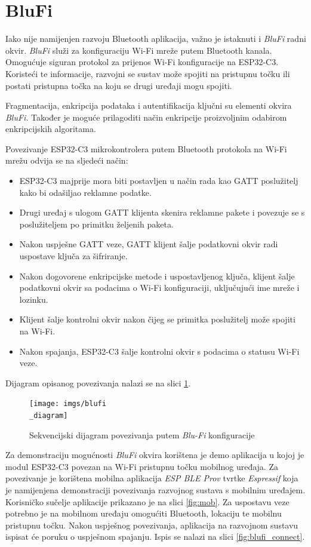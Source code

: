 \section{BluFi}

Iako nije namijenjen razvoju Bluetooth aplikacija, važno je istaknuti i \textit{BluFi} radni okvir. \textit{BluFi} služi za konfiguraciju Wi-Fi mreže putem Bluetooth kanala. Omogućuje siguran protokol za prijenos Wi-Fi konfiguracije na ESP32-C3. Koristeći te informacije, razvojni se sustav može spojiti na pristupnu točku ili postati pristupna točka na koju se drugi uređaji mogu spojiti.

Fragmentacija, enkripcija podataka i autentifikacija ključni su elementi okvira \textit{BluFi}. Također je moguće prilagoditi način enkripcije proizvoljnim odabirom enkripcijskih algoritama.

Povezivanje ESP32-C3 mikrokontrolera putem Bluetooth protokola na Wi-Fi mrežu odvija se na sljedeći način:
\begin{itemize}
	\item ESP32-C3 majprije mora biti postavljen u način rada kao GATT poslužitelj kako bi odašiljao reklamne podatke. 
	\item Drugi uređaj s ulogom GATT klijenta skenira reklamne pakete i povezuje se s poslužiteljem po primitku željenih paketa.
	\item Nakon uspješne GATT veze, GATT klijent šalje podatkovni okvir radi uspostave ključa za šifriranje.
	\item Nakon dogovorene enkripcijske metode i uspostavljenog ključa, klijent šalje podatkovni okvir sa podacima o Wi-Fi konfiguraciji, uključujući ime mreže i lozinku.
	\item Klijent šalje kontrolni okvir nakon čijeg se primitka poslužitelj može spojiti na Wi-Fi.
	\item Nakon spajanja, ESP32-C3 šalje kontrolni okvir s podacima o statusu Wi-Fi veze.
\end{itemize} 

Dijagram opisanog povezivanja nalazi se na slici \ref{fig:blufi_diagram}.

\begin{figure}[ht]
	\centering
	\texttt{[image: imgs/blufi\\\_diagram]}
	\caption{Sekvencijski dijagram povezivanja putem \textit{Blu-Fi} konfiguracije \cite{esp_bt_api}}
	\label{fig:blufi_diagram}
\end{figure}

Za demonstraciju mogućnosti \textit{BluFi} okvira korištena je demo aplikacija u kojoj je modul ESP32-C3 povezan na Wi-Fi pristupnu točku mobilnog uređaja. Za povezivanje je korištena mobilna aplikacija \textit{ESP BLE Prov} tvrtke \textit{Espressif} koja je namijenjena demonstraciji povezivanja razvojnog sustava s mobilnim uređajem. Korisničko sučelje aplikacije prikazano je na slici \ref{fig:mob}. Za uspostavu veze potrebno je na mobilnom uređaju omogućiti Bluetooth, lokaciju te mobilnu pristupnu točku. Nakon uspješnog povezivanja, aplikacija na razvojnom sustavu ispisat će poruku o uspješnom spajanju. Ispis se nalazi na slici \ref{fig:blufi_connect}.


